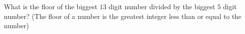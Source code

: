 What is the floor of the biggest $13$ digit number divided by the biggest $5$ digit number? (The floor of a number is the greatest integer less than or equal to the number)
